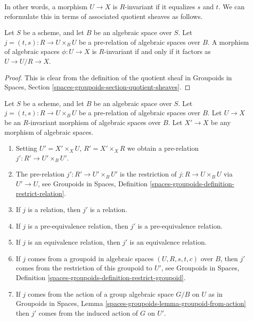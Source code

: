 \noindent
In other words, a morphism $U \to X$ is $R$-invariant if it equalizes
$s$ and $t$.  We can reformulate this in terms of associated quotient
sheaves as follows.

\begin{lemma}
\label{lemma-invariant}
Let $S$ be a scheme, and let $B$ be an algebraic space over $S$.
Let $j = (t, s) : R \to U \times_B U$ be a pre-relation of algebraic
spaces over $B$. A morphism of algebraic spaces $\phi : U \to X$ is
$R$-invariant if and only if it factors as
$U \to U/R \to X$.
\end{lemma}

\begin{proof}
This is clear from the definition of the quotient sheaf in
Groupoids in Spaces, Section \ref{spaces-groupoids-section-quotient-sheaves}.
\end{proof}

\begin{lemma}
\label{lemma-pullback-invariant}
Let $S$ be a scheme, and let $B$ be an algebraic space over $S$.
Let $j = (t, s) : R \to U \times_B U$ be a pre-relation of algebraic
spaces over $B$. Let $U \to X$ be an $R$-invariant morphism of algebraic
spaces over $B$. Let $X' \to X$ be any morphism of algebraic spaces.
\begin{enumerate}
\item Setting $U' = X' \times_X U$, $R' = X' \times_X R$ we obtain
a pre-relation $j' : R' \to U' \times_B U'$.
\item The pre-relation $j' : R' \to U' \times_B U'$ is the restriction of
$j : R \to U \times_B U$ via $U' \to U$, see
Groupoids in Spaces, Definition
\ref{spaces-groupoids-definition-restrict-relation}.
\item If $j$ is a relation, then $j'$ is a relation.
\item If $j$ is a pre-equivalence relation, then
$j'$ is a pre-equivalence relation.
\item If $j$ is an equivalence relation, then $j'$ is an equivalence
relation.
\item If $j$ comes from a groupoid in algebraic spaces
$(U, R, s, t, c)$ over $B$, then $j'$ comes from the restriction
of this groupoid to $U'$, see
Groupoids in Spaces, Definition
\ref{spaces-groupoids-definition-restrict-groupoid}.
\item If $j$ comes from the action of a group algebraic space $G/B$ on $U$
as in
Groupoids in Spaces, Lemma
\ref{spaces-groupoids-lemma-groupoid-from-action}
then $j'$ comes from the induced action of $G$ on $U'$.
\end{enumerate}
\end{lemma}

